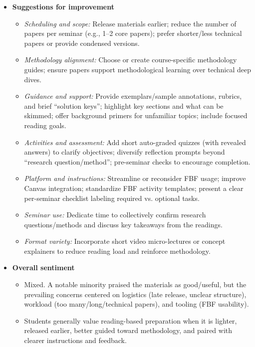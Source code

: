 \documentclass[a4paper]{report}
\begin{document}
\begin{itemize}
\item \textbf{Suggestions for improvement}
  \begin{itemize}
    \item \textit{Scheduling and scope:} Release materials earlier; reduce the number of papers per seminar (e.g., 1–2 core papers); prefer shorter/less technical papers or provide condensed versions.
    \item \textit{Methodology alignment:} Choose or create course-specific methodology guides; ensure papers support methodological learning over technical deep dives.
    \item \textit{Guidance and support:} Provide exemplars/sample annotations, rubrics, and brief “solution keys”; highlight key sections and what can be skimmed; offer background primers for unfamiliar topics; include focused reading goals.
    \item \textit{Activities and assessment:} Add short auto-graded quizzes (with revealed answers) to clarify objectives; diversify reflection prompts beyond “research question/method”; pre-seminar checks to encourage completion.
    \item \textit{Platform and instructions:} Streamline or reconsider FBF usage; improve Canvas integration; standardize FBF activity templates; present a clear per-seminar checklist labeling required vs. optional tasks.
    \item \textit{Seminar use:} Dedicate time to collectively confirm research questions/methods and discuss key takeaways from the readings.
    \item \textit{Format variety:} Incorporate short video micro-lectures or concept explainers to reduce reading load and reinforce methodology.
  \end{itemize}

\item \textbf{Overall sentiment}
  \begin{itemize}
    \item Mixed. A notable minority praised the materials as good/useful, but the prevailing concerns centered on logistics (late release, unclear structure), workload (too many/long/technical papers), and tooling (FBF usability).
    \item Students generally value reading-based preparation when it is lighter, released earlier, better guided toward methodology, and paired with clearer instructions and feedback.
  \end{itemize}
\end{itemize}
\end{document}
